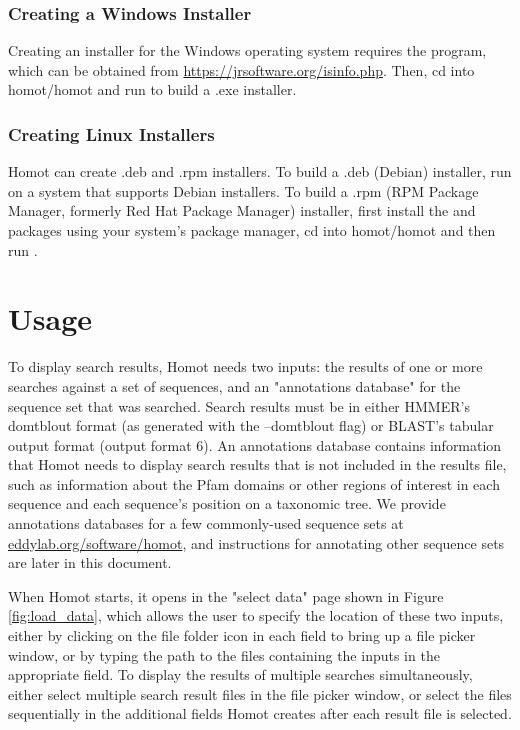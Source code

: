 \documentclass[notoc,justified,openany]{tufte-book}    %
\newcommand{\hmmer}{{HMMER}\xspace}  %
\newcommand{\homot }{{Homot}\xspace}  %
\newcommand{\homotloc}{\url{eddylab.org/software/homot}\xspace}
\begin{document}
\subsection{Creating a Windows Installer}
Creating an installer for the Windows operating system requires the  program, which can be obtained from \url{https://jrsoftware.org/isinfo.php}.  Then, cd into homot/homot and run  to build a .exe installer.

\subsection{Creating Linux Installers}
\homot can create .deb and .rpm installers.  To build a .deb (Debian) installer, run  on a system that supports Debian installers.  To build a .rpm (RPM Package Manager, formerly Red Hat Package Manager) installer, first install the  and  packages using your system's package manager, cd into homot/homot and then run . 


\chapter{Usage}
To display search results, \homot needs two inputs: the results of one or more searches against a set of sequences, and an "annotations database" for the sequence set that was searched.  Search results must be in either \hmmer's domtblout format (as generated with the --domtblout flag) or BLAST's tabular output format (output format 6).  An annotations database contains information that \homot needs to display search results that is not included in the results file, such as information about the Pfam domains or other regions of interest in each sequence and each sequence's position on a taxonomic tree. We provide annotations databases for a few commonly-used sequence sets at \homotloc, and instructions for annotating other sequence sets are later in this document.

When \homot starts, it opens in the "select data" page shown in Figure \ref{fig:load_data}, which allows the user to specify the location of these two inputs, either by clicking on the file folder icon in each field to bring up a file picker window, or by typing the path to the files containing the inputs in the appropriate field.  To display the results of multiple searches simultaneously, either select multiple search result files in the file picker window, or select the files sequentially in the additional fields \homot creates after each result file is selected.
\end{document}
